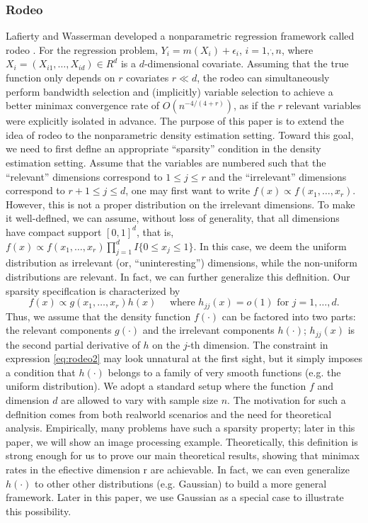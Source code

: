 \subsubsection{Rodeo}
Lafierty and Wasserman developed a nonparametric regression framework called rodeo \citep{wasserman2006rodeo}. 
For the regression problem, $Y_i = m(X_i)+\epsilon_i$, $i = 1,\dot, n$, where $X_i = (X_{i1},\dots, X_{id}) \in R^d$ is a $d$-dimensional covariate. 
Assuming that the true function only depends on $r$ covariates $r \ll d$, the rodeo can simultaneously perform bandwidth selection and (implicitly) variable selection to achieve a better minimax convergence rate of $O(n^{-4/(4+r)})$, as if the $r$ relevant variables were explicitly isolated in advance. 
The purpose of this paper is to extend the idea of rodeo to the nonparametric density estimation setting. 
Toward this goal, we need to first deflne an appropriate ``sparsity'' condition in the density estimation setting. 
Assume that the variables are numbered such that the ``relevant'' dimensions correspond to $1 \le j \le r$ and the ``irrelevant'' dimensions correspond to $r + 1 \le j \le d$, one may first want to write $f(x) \propto f(x_1, \dots, x_r)$. 
However, this is not a proper distribution on the irrelevant dimensions. 
To make it well-deflned, we can assume, without loss of generality, that all dimensions have compact support $[0, 1]^d$, that is, $f(x) \propto f(x_1, \dots, x_r) \prod^d_{j=1} I\{0 \le x_j \le 1\}$. 
In this case, we deem the uniform distribution as irrelevant (or, ``uninteresting'') dimensions, while the non-uniform distributions are relevant. 
In fact, we can further generalize this deflnition. Our sparsity speciflcation is characterized by
\begin{equation}\label{eq:rodeo2}
    f(x) \propto g\left(x_{1}, \ldots, x_{r}\right) h(x) \quad \text { where } h_{j j}(x)=o(1) \text { for } j=1, \ldots, d.
\end{equation}
Thus, we assume that the density function $f(\cdot)$ can be factored into two parts: the relevant components $g(\cdot)$ and the irrelevant components $h(\cdot)$; $h_{jj}(x)$ is the second partial derivative of $h$ on the $j$-th dimension. 
The constraint in expression \ref{eq:rodeo2} may look unnatural at the first sight, but it simply imposes a condition that $h(\cdot)$ belongs to a family of very smooth functions (e.g. the uniform distribution). 
We adopt a standard setup where the function $f$ and dimension $d$ are allowed to vary with sample size $n$. 
The motivation for such a deflnition comes from both realworld scenarios and the need for theoretical analysis. 
Empirically, many problems have such a sparsity property; later in this paper, we will show an image processing example. 
Theoretically, this definition is strong enough for us to prove our main theoretical results, showing that minimax rates in the efiective dimension r are achievable. 
In fact, we can even generalize $h(\cdot)$ to other other distributions (e.g. Gaussian) to build a more general framework. 
Later in this paper, we use Gaussian as a special case to illustrate this possibility.

